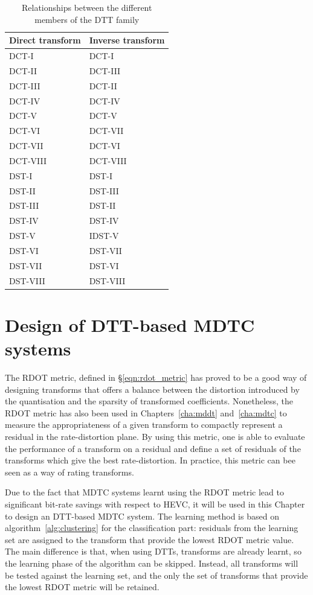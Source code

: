 \documentclass[11pt,a4paper,openright,twoside]{book}
\numberwithin{equation}{section} %
\numberwithin{figure}{section} %
\numberwithin{table}{section} %
\begin{document}
\begin{table}[tb]
	\centering
	\caption{Relationships between the different members of the \acs{DTT}
	family}
	\label{tab:dtt_relationships}
	\begin{tabular}{l|l}
		Direct transform & Inverse transform \\
		\hline\hline
		DCT-I    & DCT-I    \\
		DCT-II   & DCT-III  \\
		DCT-III  & DCT-II   \\
		DCT-IV   & DCT-IV   \\
		DCT-V    & DCT-V    \\
		DCT-VI   & DCT-VII  \\
		DCT-VII  & DCT-VI   \\
		DCT-VIII & DCT-VIII \\
		\hline
		DST-I    & DST-I    \\
		DST-II   & DST-III  \\
		DST-III  & DST-II   \\
		DST-IV   & DST-IV   \\
		DST-V    & IDST-V   \\
		DST-VI   & DST-VII  \\
		DST-VII  & DST-VI   \\
		DST-VIII & DST-VIII \\
	\end{tabular}
\end{table}

\section{Design of \acs{DTT}-based \acs{MDTC} systems}
\label{sec:design_dtt_based_mdtc_systems}

The \ac{RDOT} metric, defined in \S\ref{eqn:rdot_metric} has proved to be a
good way of designing transforms that offers a balance between the distortion
introduced by the quantisation and the sparsity of transformed coefficients.
Nonetheless, the \ac{RDOT} metric has also been used in
Chapters~\ref{cha:mddt} and~\ref{cha:mdtc} to measure the appropriateness of a
given transform to compactly represent a residual in the rate-distortion
plane.
By using this metric, one is able to evaluate the performance of a transform
on a residual and define a set of residuals of the transforms which give the
best rate-distortion.
In practice, this metric can bee seen as a way of rating transforms.

Due to the fact that \ac{MDTC} systems learnt using the \acs{RDOT} metric lead
to significant bit-rate savings with respect to \ac{HEVC}, it will be used in
this Chapter to design an \ac{DTT}-based \ac{MDTC} system.
The learning method is based on algorithm~\ref{alg:clustering} for the
classification part:
residuals from the learning set are assigned to the transform that provide the
lowest \acs{RDOT} metric value.
The main difference is that, when using \acp{DTT}, transforms are already
learnt, so the learning phase of the algorithm can be skipped.
Instead, all transforms will be tested against the learning set, and the only
the set of transforms that provide the lowest \ac{RDOT} metric will be
retained.
\end{document}
